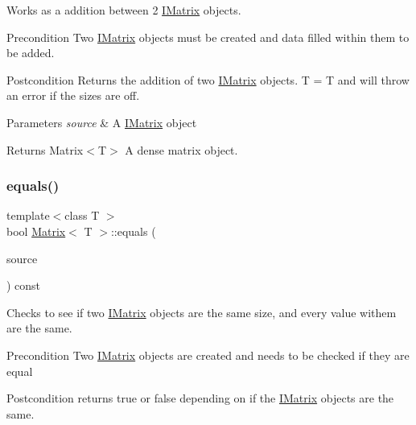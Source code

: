 Works as a addition between 2 \mbox{\hyperlink{class_i_matrix}{I\+Matrix}} objects. 

\begin{DoxyPrecond}{Precondition}
Two \mbox{\hyperlink{class_i_matrix}{I\+Matrix}} objects must be created and data filled within them to be added. 
\end{DoxyPrecond}
\begin{DoxyPostcond}{Postcondition}
Returns the addition of two \mbox{\hyperlink{class_i_matrix}{I\+Matrix}} objects. T = T and will throw an error if the sizes are off.
\end{DoxyPostcond}

\begin{DoxyParams}{Parameters}
{\em source} & A \mbox{\hyperlink{class_i_matrix}{I\+Matrix}} object \\
\hline
\end{DoxyParams}
\begin{DoxyReturn}{Returns}
Matrix$<$\+T$>$ A dense matrix object. 
\end{DoxyReturn}
\mbox{\label{class_matrix_a7bdfaca00fd65171656fd45bdaa6b2a0}} 
\subsubsection{\texorpdfstring{equals()}{equals()}\hspace{0.1cm}{\footnotesize\ttfamily [1/6]}}
{\footnotesize\ttfamily template$<$class T $>$ \\
bool \mbox{\hyperlink{class_matrix}{Matrix}}$<$ T $>$\+::equals (\begin{DoxyParamCaption}\item[{const \mbox{\hyperlink{class_i_matrix}{I\+Matrix}}$<$ \mbox{\hyperlink{class_matrix}{Matrix}}$<$ T $>$, T $>$ \&}]{source }\end{DoxyParamCaption}) const\hspace{0.3cm}{\ttfamily [virtual]}}



Checks to see if two \mbox{\hyperlink{class_i_matrix}{I\+Matrix}} objects are the same size, and every value withem are the same. 

\begin{DoxyPrecond}{Precondition}
Two \mbox{\hyperlink{class_i_matrix}{I\+Matrix}} objects are created and needs to be checked if they are equal 
\end{DoxyPrecond}
\begin{DoxyPostcond}{Postcondition}
returns true or false depending on if the \mbox{\hyperlink{class_i_matrix}{I\+Matrix}} objects are the same.
\end{DoxyPostcond}

